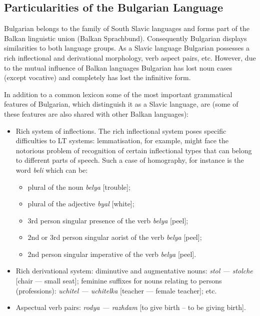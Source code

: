\documentclass[]{../../metanetpaper}
\begin{document}
\begin{multicols}{2}
\subsection{Particularities of the Bulgarian Language}

Bulgarian belongs to the family of South Slavic languages and forms part of the Balkan linguistic union (Balkan Sprachbund). Consequently Bulgarian displays similarities to both language groups. As a Slavic language Bulgarian possesses a rich inflectional and derivational morphology, verb aspect pairs, etc. However, due to the mutual influence of Balkan languages Bulgarian has lost noun cases (except vocative) and completely has lost the infinitive form.


In addition to a common lexicon some of the most important grammatical features of Bulgarian, which distinguish it as a Slavic language, are (some of these features are also shared with other Balkan languages):
\begin{itemize}
\item Rich system of inflections. The rich inflectional system poses specific difficulties to LT systems: lemmatisation, for example, might face the notorious problem of recognition of certain inflectional types that can belong to different parts of speech. Such a case of homography, for instance is the word \textit{{beli}} which can be: 
\begin{itemize}
\item plural of the noun \textit{{belya}} [trouble];
\item plural of the adjective \textit{{byal}} [white];
\item 3rd person singular presence of the verb \textit{{belya}} [peel];
\item 2nd or 3rd person singular aorist of the verb \textit{{belya}} [peel];
\item 2nd person singular imperative of the verb \textit{{belya}} [peel]. 
\end{itemize}

\item Rich derivational system: diminutive and augmentative nouns: \textit{{stol — stolche}} [chair — small seat]; feminine suffixes for nouns relating to persons (professions): \textit{{uchitel — uchitelka}} [teacher — female teacher]; etc.

\item Aspectual verb pairs: \textit{{rodya — razhdam}} [to give birth – to be giving birth].


\end{itemize}
\end{multicols}
\end{document}
